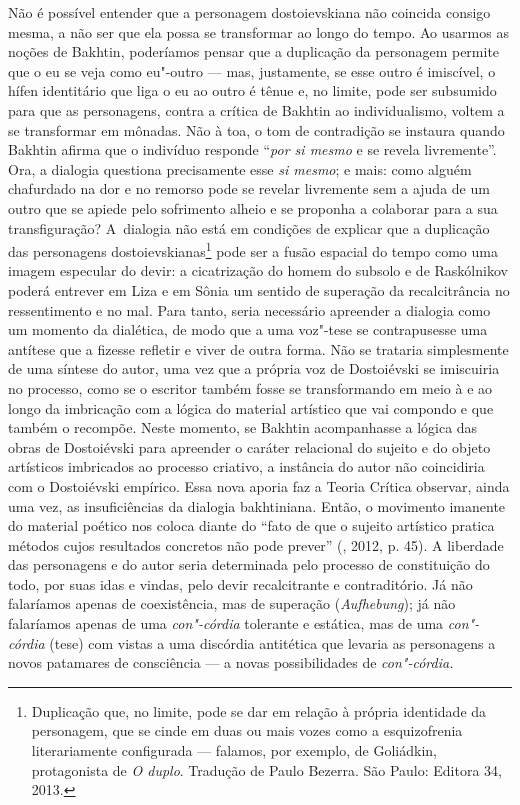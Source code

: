 Não é possível entender que a personagem dostoievskiana não coincida
consigo mesma, a não ser que ela possa se transformar ao longo do tempo.
Ao usarmos as noções de Bakhtin, poderíamos pensar que a duplicação da
personagem permite que o eu se veja como eu"-outro --- mas, justamente, se
esse outro é imiscível, o hífen identitário que liga o eu ao outro é
tênue e, no limite, pode ser subsumido para que as personagens, contra a
crítica de Bakhtin ao individualismo, voltem a se transformar em
mônadas. Não à toa, o tom de contradição se instaura quando Bakhtin
afirma que o indivíduo responde ``\emph{por si mesmo} e se revela
livremente''. Ora, a dialogia questiona precisamente esse \emph{si
mesmo}; e mais: como alguém chafurdado na dor e no remorso pode se
revelar livremente sem a ajuda de um outro que se apiede pelo sofrimento
alheio e se proponha a colaborar para a sua transfiguração? A~dialogia
não está em condições de explicar que a duplicação das personagens
dostoievskianas\footnote{Duplicação que, no limite, pode se dar em
  relação à própria identidade da personagem, que se cinde em duas ou
  mais vozes como a esquizofrenia literariamente configurada --- falamos,
  por exemplo, de Goliádkin, protagonista de \emph{O duplo}. Tradução de
  Paulo Bezerra. São Paulo: Editora 34, 2013.} pode ser a fusão espacial
do tempo como uma imagem especular do devir: a cicatrização do homem do
subsolo e de Raskólnikov poderá entrever em Liza e em Sônia um sentido
de superação da recalcitrância no ressentimento e no mal. Para tanto,
seria necessário apreender a dialogia como um momento da dialética, de
modo que a uma voz"-tese se contrapusesse uma antítese que a fizesse
refletir e viver de outra forma. Não se trataria simplesmente de uma
síntese do autor, uma vez que a própria voz de Dostoiévski se imiscuiria
no processo, como se o escritor também fosse se transformando em meio à
e ao longo da imbricação com a lógica do material artístico que vai
compondo e que também o recompõe. Neste momento, se Bakhtin acompanhasse
a lógica das obras de Dostoiévski para apreender o caráter relacional do
sujeito e do objeto artísticos imbricados ao processo criativo, a
instância do autor não coincidiria com o Dostoiévski empírico. Essa nova
aporia faz a Teoria Crítica observar, ainda uma vez, as insuficiências
da dialogia bakhtiniana. Então, o movimento imanente do material poético
nos coloca diante do ``fato de que o sujeito artístico pratica métodos
cujos resultados concretos não pode prever'' (, 2012, p. 45). A
liberdade das personagens e do autor seria determinada pelo processo de
constituição do todo, por suas idas e vindas, pelo devir recalcitrante e
contraditório. Já não falaríamos apenas de coexistência, mas de
superação (\emph{Aufhebung}); já não falaríamos apenas de uma
\emph{con"-córdia} tolerante e estática, mas de uma \emph{con"-córdia}
(tese) com vistas a uma discórdia antitética que levaria as personagens
a novos patamares de consciência --- a novas possibilidades de
\emph{con"-córdia.}

